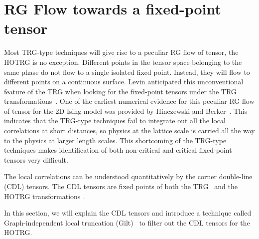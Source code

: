 \documentclass[aps,prb,reprint,superscriptaddress]{revtex4-2}
\begin{document}
\section{RG Flow towards a fixed-point tensor\label{fixRGflow}} Most
TRG-type techniques will give rise to a peculiar RG flow of tensor, the
HOTRG is no exception. Different points in the tensor space belonging to
the same phase do not flow to a single isolated fixed point. Instead,
they will flow to different points on a continuous surface. Levin
anticipated this unconventional feature of the TRG when looking for the
fixed-point tensors under the TRG transformations~\cite{LevinTalk}. One
of the earliest numerical evidence for this peculiar RG flow of tensor
for the 2D Ising model was provided by Hinczewski and
Berker~\cite{Berker2008}. This indicates that the TRG-type techniques
fail to integrate out all the local correlations at short distances, so
physics at the lattice scale is carried all the way to the physics at
larger length scales. This shortcoming of the TRG-type techniques makes
identification of both non-critical and critical fixed-point tensors
very difficult.
%

The local correlations can be understood quantitatively by the corner
double-line (CDL) tensors. The CDL tensors are fixed points of both the
TRG~\cite{LevinTalk,GuWen2009,tnr,gilts} and the HOTRG
transformations~\cite{hotrgfixpoint}.

In this section, we will explain the CDL tensors and introduce a
technique called Graph-independent local truncation (Gilt)~\cite{gilts}
to filter out the CDL tensors for the HOTRG.
\end{document}
